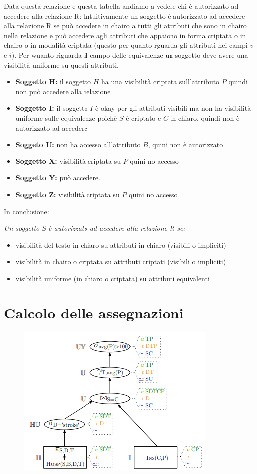\documentclass{report}
\begin{document}
\noindent Data questa relazione e questa tabella andiamo a vedere chi è autorizzato ad accedere alla relazione R:
Intuitivamente un soggetto è autorizzato ad accedere alla relazione R se può accedere in chairo a tutti gli attributi che sono in chairo nella relazione e può accedere agli attributi
che appaiono in forma criptata o in chairo o in modalità criptata (questo per quanto rguarda gli attributi nei campi $v$ e $i$). Per wuanto riguarda il campo delle equivalenze un soggetto
deve avere una visibilità uniforme su questi attributi.
\begin{itemize}
    \item \textbf{Soggetto H:} il soggetto $H$ ha una visibilità criptata sull'attributo $P$ quindi non può accedere alla relazione 
    \item \textbf{Soggetto I:} il soggetto $I$ è okay per gli attributi visibili  ma non ha visibilità uniforme sulle equivalenze poichè $S$ è criptato e $C$ in chiaro, quindi non è autorizzato ad accedere 
    \item \textbf{Soggeto U:} non ha accesso all'attributo $B$, quini non è autorizzato
    \item \textbf{Soggetto X:} visibilità criptata su $P$ quini no accesso
    \item \textbf{Soggetto Y:} può accedere.
    \item \textbf{Soggetto Z:} visibilità criptata su $P$ quini no accesso
\end{itemize} 

\noindent In conclusione:

\noindent \textit{Un soggetto S è autorizzato ad accedere alla relazione R se:}
\begin{itemize}
    \item visibilità del testo in chiaro su attributi in chiaro (visibili o impliciti)
    \item visibilità in chairo o criptata su attributi criptati (visibili o impliciti)
    \item visibilità uniforme (in chiaro o criptata) su attributi equivalenti
\end{itemize}


\section{Calcolo delle assegnazioni}
\begin{figure}[H]
    \centering
    \includegraphics[width=0.6\linewidth]{images/calcoloassegnazioni.png}
\end{figure}
\end{document}
